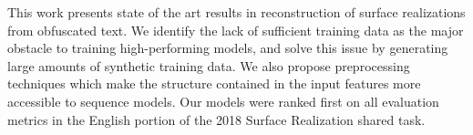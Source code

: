 This work presents state of the art results in reconstruction of surface realizations from obfuscated text. We identify the lack of sufficient training data as the major obstacle to training high-performing models, and solve this issue by generating large amounts of synthetic training data. We also propose preprocessing techniques which make the structure contained in the input features more accessible to sequence models. Our models were ranked first on all evaluation metrics in the English portion of the 2018 Surface Realization shared task.
